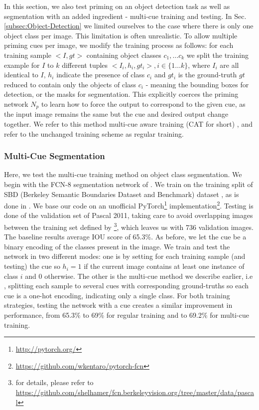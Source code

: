 \documentclass[10pt,letterpaper,twocolumn]{article}
\begin{document}
In this section, we also test priming on an object detection task
as well as segmentation with an added ingredient - multi-cue training
and testing. In Sec. \ref{subsec:Object-Detection} we limited ourselves
to the case where there is only one object class per image. This limitation
is often unrealistic. To allow multiple priming cues per image, we
modify the training process as follows: for each training sample $<I,gt>$
containing object classes $c_{1},\dots c_{k}$ we split the training
example for $I$ to $k$ different tuples $<I_{i},h_{i},gt_{i}>,i\in\{1\dots k\}$,
where $I_{i}$ are all identical to $I$, $h_{i}$ indicate the presence
of class $c_{i}$ and $gt_{i}$ is the ground-truth $gt$ reduced
to contain only the objects of class $c_{i}$ - meaning the bounding
boxes for detection, or the masks for segmentation. This explicitly
coerces the priming network $N_{p}$ to learn how to force the output
to correspond to the given cue, as the input image remains the same
but the cue and desired output change together. We refer to this method
multi-cue aware training (CAT for short) , and refer to the unchanged
training scheme as regular training. 

\subsubsection{Multi-Cue Segmentation }

Here, we test the multi-cue training method on object class segmentation.
We begin with the FCN-8 segmentation network of \cite{long2015fully}.
We train on the training split of SBD (Berkeley Semantic Boundaries
Dataset and Benchmark) dataset \cite{hariharan2011semantic}, as is
done in \cite{zhao2016pyramid,chen2016deeplab,dai2015boxsup,long2015fully}.
We base our code on an unofficial PyTorch\footnote{\url{http://pytorch.org/}}
implementation\footnote{\url{https://github.com/wkentaro/pytorch-fcn}}.
Testing is done of the validation set of Pascal 2011, taking care
to avoid overlapping images between the training set defined by \cite{hariharan2011semantic}
\footnote{for details, please refer to \url{https://github.com/shelhamer/fcn.berkeleyvision.org/tree/master/data/pascal}},
which leaves us with 736 validation images. The baseline results average
IOU score of 65.3\%. As before, we let the cue be a binary encoding
of the classes present in the image. We train and test the network
in two different modes: one is by setting for each training sample
(and testing) the cue so $h_{i}=1$ if the current image contains
at least one instance of class $i$ and 0 otherwise. The other is
the multi-cue method we describe earlier, i.e , splitting each sample
to several cues with corresponding ground-truths so each cue is a
one-hot encoding, indicating only a single class. For both training
strategies, testing the network with a cue creates a similar improvement
in performance, from 65.3\% to 69\% for regular training and to 69.2\%
for multi-cue training. 
\end{document}
